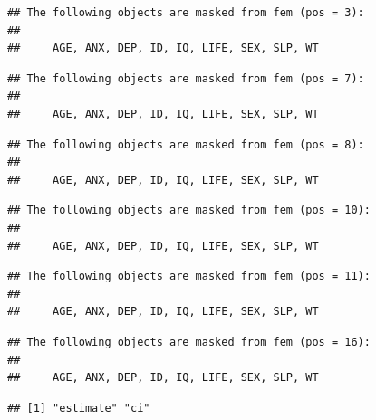\documentclass[12pt,a4paper]{book}
\newenvironment{Shaded}{\begin{snugshade}}{\end{snugshade}}
\newcommand{\DataTypeTok}[1]{\textcolor[rgb]{0.13,0.29,0.53}{#1}}
\newcommand{\DecValTok}[1]{\textcolor[rgb]{0.00,0.00,0.81}{#1}}
\newcommand{\KeywordTok}[1]{\textcolor[rgb]{0.13,0.29,0.53}{\textbf{#1}}}
\newcommand{\NormalTok}[1]{#1}
\newcommand{\OperatorTok}[1]{\textcolor[rgb]{0.81,0.36,0.00}{\textbf{#1}}}
\newcommand{\OtherTok}[1]{\textcolor[rgb]{0.56,0.35,0.01}{#1}}
\newcommand{\StringTok}[1]{\textcolor[rgb]{0.31,0.60,0.02}{#1}}
\theoremstyle{definition}
\theoremstyle{definition}
\theoremstyle{definition}
\theoremstyle{remark}
\begin{document}
\begin{Shaded}
\end{Shaded}

\begin{verbatim}
## The following objects are masked from fem (pos = 3):
## 
##     AGE, ANX, DEP, ID, IQ, LIFE, SEX, SLP, WT
\end{verbatim}

\begin{verbatim}
## The following objects are masked from fem (pos = 7):
## 
##     AGE, ANX, DEP, ID, IQ, LIFE, SEX, SLP, WT
\end{verbatim}

\begin{verbatim}
## The following objects are masked from fem (pos = 8):
## 
##     AGE, ANX, DEP, ID, IQ, LIFE, SEX, SLP, WT
\end{verbatim}

\begin{verbatim}
## The following objects are masked from fem (pos = 10):
## 
##     AGE, ANX, DEP, ID, IQ, LIFE, SEX, SLP, WT
\end{verbatim}

\begin{verbatim}
## The following objects are masked from fem (pos = 11):
## 
##     AGE, ANX, DEP, ID, IQ, LIFE, SEX, SLP, WT
\end{verbatim}

\begin{verbatim}
## The following objects are masked from fem (pos = 16):
## 
##     AGE, ANX, DEP, ID, IQ, LIFE, SEX, SLP, WT
\end{verbatim}

\begin{verbatim}
## [1] "estimate" "ci"
\end{verbatim}
\end{document}
